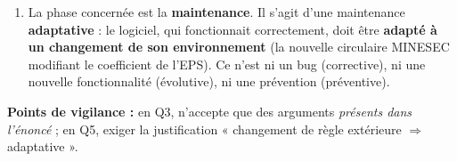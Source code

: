 \documentclass[11pt]{article}
\begin{document}
\begin{corrige}
\begin{enumerate}
\begin{itemize}
        \item Saisir les notes d'une classe, lancer le calcul et vérifier que la \textbf{moyenne pondérée} d'un élève est correcte (contrôle manuel d'un cas) ;
        \item Éditer un \textbf{bulletin} et vérifier qu'il est \textbf{conforme au format officiel MINESEC} (en-tête, matières, coefficients, rang, mention) ;
        \item (autre exemple accepté) saisir une note supérieure à 20 et vérifier que le système la refuse.
    \end{itemize}
    \item La phase concernée est la \textbf{maintenance}. Il s'agit d'une maintenance \textbf{adaptative} : le logiciel, qui fonctionnait correctement, doit être \textbf{adapté à un changement de son environnement} (la nouvelle circulaire MINESEC modifiant le coefficient de l'EPS). Ce n'est ni un bug (corrective), ni une nouvelle fonctionnalité (évolutive), ni une prévention (préventive).
\end{enumerate}
\textbf{Points de vigilance :} en Q3, n'accepte que des arguments \emph{présents dans l'énoncé} ; en Q5, exiger la justification « changement de règle extérieure $\Rightarrow$ adaptative ».
\end{corrige}
\end{document}
